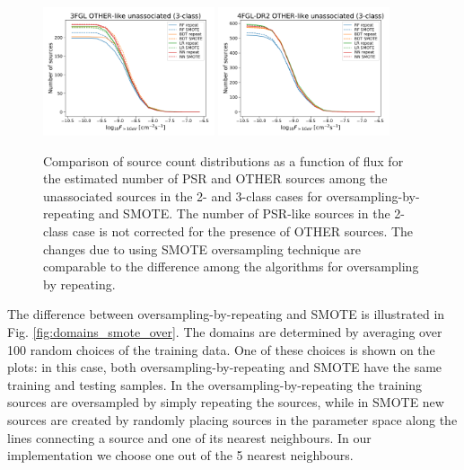 \begin{figure}[h]
\hspace*{-0.5cm}
\includegraphics[width=0.45\textwidth]{plots/oversample/N_logS_3FGL_OTHER_3classes_O_vs_S.pdf}
\hspace*{-0.5cm}
\includegraphics[width=0.45\textwidth]{plots/oversample/N_logS_4FGL-DR2_OTHER_3classes_O_vs_S.pdf}
\caption{Comparison of source count distributions as a function of flux for the estimated number of PSR and OTHER sources
among the unassociated sources in the 2- and 3-class cases for oversampling-by-repeating and SMOTE.
The number of PSR-like sources in the 2-class case is not corrected for the presence of OTHER sources.
The changes due to using SMOTE oversampling technique are comparable to the difference among the algorithms
for oversampling by repeating.
}
\label{fig:S_vs_O_NlogS}
\end{figure}


The difference between oversampling-by-repeating and SMOTE is illustrated in Fig. \ref{fig:domains_smote_over}.
The domains are determined by averaging over 100 random choices of the training data.
One of these choices is shown on the plots: in this case, both oversampling-by-repeating and SMOTE have the same 
training and testing samples.
In the oversampling-by-repeating the training sources are oversampled by simply repeating the sources,
while in SMOTE new sources are created by randomly placing sources in the parameter space along the lines connecting a source
and one of its nearest neighbours. In our implementation we choose one out of the 5 nearest neighbours. 




